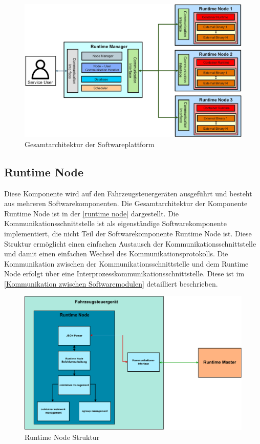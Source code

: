 \begin{figure}[htbp]
	\centering
	\includegraphics[width=\textwidth]{./content/graphics/Architecture.pdf}
	\caption{Gesamtarchitektur der Softwareplattform}
	\label{architektur}
\end{figure}

\subsection{Runtime Node}

Diese Komponente wird auf den Fahrzeugsteuergeräten ausgeführt und besteht aus mehreren Softwarekomponenten. Die Gesamtarchitektur der Komponente Runtime Node ist in der \autoref{runtime node} dargestellt. Die Kommunikationsschnittstelle ist als eigenständige Softwarekomponente implementiert, die nicht Teil der Softwarekomponente Runtime Node ist. Diese Struktur ermöglicht einen einfachen Austausch der Kommunikationsschnittstelle und damit einen einfachen Wechsel des Kommunikationsprotokolls. Die Kommunikation zwischen der Kommunikationsschnittstelle und dem Runtime Node erfolgt über eine Interprozesskommunikationsschnittstelle. Diese ist im \autoref{Kommunikation zwischen Softwaremodulen} detailliert beschrieben. 

\begin{figure}[htbp]
	\centering
	\includegraphics[width=\textwidth]{./content/graphics/Runtime_Node_Arch.pdf}
	\caption{Runtime Node Struktur}
	\label{runtime node}
\end{figure}

